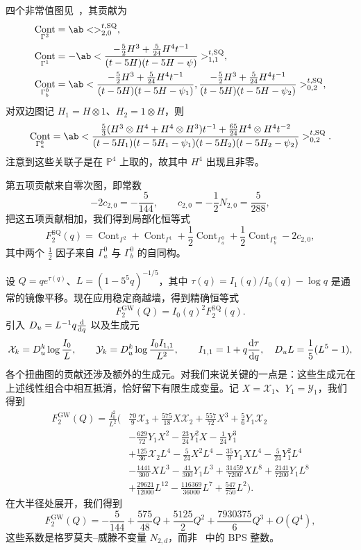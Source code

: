 \documentclass{amsart}
\theoremstyle{definition}
\theoremstyle{remark}
\theoremstyle{plain}
\theoremstyle{definition}
\theoremstyle{remark}
\renewcommand{\P}{\mathbb{P}}
\newcommand{\mc}[1]{\mathcal{#1}}
\newcommand{\mr}[1]{\mathrm{#1}}
\newcommand{\1}{\mathbf{1}}
\newcommand{\2}{\mathbf{2}}
\newcommand{\3}{\mathbf{3}}
\DeclareMathOperator{\Cont}{Cont}
\begin{document}
四个非常值图见~，其贡献为
\begin{align*}
    \Cont_{\Gamma^2} &= \ab<>^{t,\mr{SQ}}_{2,0}, \\
    \Cont_{\Gamma^1} &= -\ab< \frac{-\frac{5}{2}H^3 + \frac{5}{24}H^4t^{-1}}{(t-5H)(t-5H-\psi)}>^{t,\mr{SQ}}_{1,1}, \\
    \Cont_{\Gamma_b^0} &= \ab< \frac{-\frac{5}{2}H^3+\frac{5}{24}H^4t^{-1}}{(t-5H)(t-5H-\psi_1)}, \frac{-\frac{5}{2}H^3+\frac{5}{24}H^4t^{-1}}{(t-5H)(t-5H-\psi_2)}>^{t,\mr{SQ}}_{0,2},
\end{align*}
对双边图记 \(H_1 = H \otimes 1\)、\(H_2 = 1 \otimes H\)，则
\[ \Cont_{\Gamma_a^0} = \ab< \frac{\frac{5}{3}(H^3\otimes H^4 + H^4 \otimes H^3)t^{-1} + \frac{65}{24}H^4 \otimes H^4 t^{-2}}{(t-5H_1)(t-5H_1-\psi_1)(t-5H_2)(t-5H_2-\psi_2)}>^{t,\mr{SQ}}_{0,2}. \]
注意到这些关联子是在 \(\P^4\) 上取的，故其中 \(H^4\) 出现且非零。

第五项贡献来自零次图，即常数
\[ -2c_{2,0} = -\frac{5}{144}, \qquad c_{2,0} = -\frac{1}{2}N_{2,0} = \frac{5}{288}, \]
把这五项贡献相加，我们得到局部化恒等式
\[ F_2^{\mr{SQ}}(q) = \Cont_{\Gamma^2} + \Cont_{\Gamma^1} + \frac{1}{2}\Cont_{\Gamma_a^0} + \frac{1}{2}\Cont_{\Gamma_b^0} - 2c_{2,0}, \]
其中两个 \(\frac{1}{2}\) 因子来自 \(\Gamma_a^0\) 与 \(\Gamma_b^0\) 的自同构。

设 \(Q = qe^{\tau(q)}\)、\(L = (1-5^5q)^{-1/5}\)，其中 \(\tau(q) = I_1(q)/I_0(q) - \log q\) 是通常的镜像平移。现在应用稳定商越墙，得到精确恒等式
\[ F_2^{\mr{GW}}(Q) = I_0(q)^2 F_2^{\mr{SQ}}(q). \]
引入 \(D_u = L^{-1}q\odv{}{q}\) 以及生成元
\[ \mc{X}_k = D_u^k \log \frac{I_0}{L}, \qquad \mc{Y}_k = D_u^k \log \frac{I_0I_{1,1}}{L^2}, \qquad I_{1,1} = 1 + q \odv{\tau}{q}, \quad D_u L = \frac{1}{5}(L^5-1), \]
各个扭曲图的贡献还涉及额外的生成元。对我们来说关键的一点是：这些生成元在上述线性组合中相互抵消，恰好留下有限生成变量。记 \(X = \mc{X}_1\)、\(Y_1 = \mc{Y}_1\)，我们得到
\begin{align*}
    F^{\mr{GW}}_2(Q) = \frac{I_0^2}{L^2}\Big(&\frac{70}{9}\mc{X}_3 + \frac{575}{18}X\mc{X}_2 + \frac{557}{72}X^3 + \frac{5}{6}Y_1\mc{X}_2 \\
    &- \frac{629}{72}Y_1X^2 - \frac{23}{24}Y_1^2 X - \frac{1}{24}Y_1^3 \\
    &+ \frac{125}{36}\mc{X}_2 L^4 - \frac{5}{24}X^2L^4 - \frac{35}{9}Y_1XL^4 - \frac{5}{24}Y_1^2L^4 \\
    &- \frac{1441}{300}XL^3 - \frac{41}{300}Y_1L^3 + \frac{31459}{7200}XL^8 + \frac{2141}{7200}Y_1L^8 \\
    &+ \frac{29621}{12000}L^{12} - \frac{116369}{36000}L^7 + \frac{547}{750}L^2\Big).
\end{align*}
在大半径处展开，我们得到
\[ F_2^{\mr{GW}}(Q) = -\frac{5}{144} + \frac{575}{48}Q + \frac{5125}{2}Q^2 + \frac{7930375}{6}Q^3 + O(Q^4), \]
这些系数是格罗莫夫–威滕不变量 \(N_{2,d}\)，而非~ 中的 BPS 整数。
\end{document}
